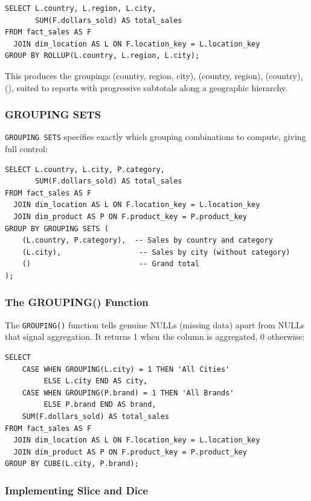 \begin{lstlisting}
SELECT L.country, L.region, L.city,
       SUM(F.dollars_sold) AS total_sales
FROM fact_sales AS F
  JOIN dim_location AS L ON F.location_key = L.location_key
GROUP BY ROLLUP(L.country, L.region, L.city);
\end{lstlisting}

This produces the groupings (country, region, city), (country, region), (country), (), suited to reports with progressive subtotals along a geographic hierarchy.

\subsubsection{GROUPING SETS}
\label{subsec:grouping-sets}

\texttt{GROUPING SETS} specifies exactly which grouping combinations to compute, giving full control:

\begin{lstlisting}
SELECT L.country, L.city, P.category,
       SUM(F.dollars_sold) AS total_sales
FROM fact_sales AS F
  JOIN dim_location AS L ON F.location_key = L.location_key
  JOIN dim_product AS P ON F.product_key = P.product_key
GROUP BY GROUPING SETS (
    (L.country, P.category),  -- Sales by country and category
    (L.city),                  -- Sales by city (without category)
    ()                         -- Grand total
);
\end{lstlisting}

\subsubsection{The GROUPING() Function}
\label{subsec:grouping-function}

The \texttt{GROUPING()} function tells genuine NULLs (missing data) apart from NULLs that signal aggregation. It returns 1 when the column is aggregated, 0 otherwise:

\begin{lstlisting}
SELECT
    CASE WHEN GROUPING(L.city) = 1 THEN 'All Cities'
         ELSE L.city END AS city,
    CASE WHEN GROUPING(P.brand) = 1 THEN 'All Brands'
         ELSE P.brand END AS brand,
    SUM(F.dollars_sold) AS total_sales
FROM fact_sales AS F
  JOIN dim_location AS L ON F.location_key = L.location_key
  JOIN dim_product AS P ON F.product_key = P.product_key
GROUP BY CUBE(L.city, P.brand);
\end{lstlisting}

\subsubsection{Implementing Slice and Dice}
\label{subsec:slice-dice-sql}

